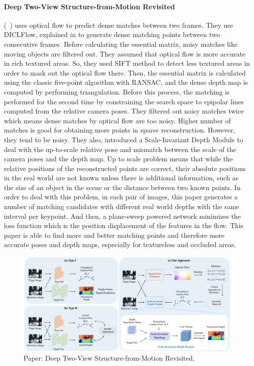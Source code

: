 \documentclass[11pt]{article}
\begin{document}
    \paragraph{Deep Two-View Structure-from-Motion Revisited} (~\cite{wang2021deep}) uses optical flow to predict
    dense matches between two frames. They use DICLFlow, explained in \cite{wang2020displacement} to generate
    dense matching points between two consecutive frames. Before calculating the essential matrix, noisy matches
    like moving objects are filtered out. They assumed that optical flow is more accurate in rich textured areas.
    So, they used SIFT method to detect less textured areas in order to mask out the optical flow there.
    Then, the essential matrix is calculated using the classic five-point algorithm with RANSAC, and
    the dense depth map is computed by performing triangulation. Before this process, the matching is performed
    for the second time by constraining the search space to epipolar lines computed from the relative camera poses.
    They filtered out noisy matches twice which means dense matches by optical flow are too noisy. Higher number of matches is good
    for obtaining more points in sparse reconstruction. However, they tend to be noisy. They also,
    introduced a Scale-Invariant Depth Module to deal with the up-to-scale relative pose and mismatch between the
    scale of the camera poses and the depth map. Up to scale problem means that while the
    relative positions of the reconstructed points are correct, their absolute positions in the real world
    are not known unless there is additional information, such as the size of an object in the scene or the
    distance between two known points. In order to deal with this problem, in each pair of images, this paper
    generates a number of matching candidates with different real world depths with the same interval per keypoint.
    And then, a plane-sweep powered network minimizes the loss function which is the position displacement of
    the features in the flow. This paper is able to find more and better matching points and therefore more
    accurate poses and depth maps, especially for textureless and occluded areas.

    \begin{figure}
    \centering
    \includegraphics[width=\textwidth,height=\textheight,keepaspectratio]{images/deep_two_sfm.jpg}
    \caption{Paper: Deep Two-View Structure-from-Motion Revisited, \cite{wang2021deep}}
    \end{figure}
\end{document}
